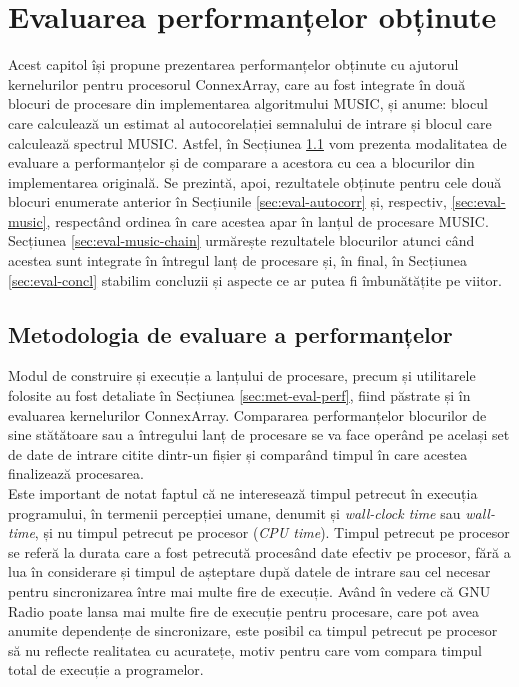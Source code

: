 \chapter{Evaluarea performanțelor obținute}
\label{chapter:eval}

Acest capitol își propune prezentarea performanțelor obținute cu ajutorul
kernelurilor pentru procesorul ConnexArray, care au fost integrate în două
blocuri de procesare din implementarea algoritmului MUSIC, și anume: blocul care
calculează un estimat al autocorelației semnalului de intrare și blocul care
calculează spectrul MUSIC. Astfel, în Secțiunea \ref{sec:eval-met} vom prezenta
modalitatea de evaluare a performanțelor și de comparare a acestora cu cea a
blocurilor din implementarea originală. Se prezintă, apoi, rezultatele obținute
pentru cele două blocuri enumerate anterior în Secțiunile \ref{sec:eval-autocorr} și,
respectiv, \ref{sec:eval-music}, respectând ordinea în care acestea apar în
lanțul de procesare MUSIC. Secțiunea \ref{sec:eval-music-chain} urmărește
rezultatele blocurilor atunci când acestea sunt integrate în întregul lanț de
procesare și, în final, în Secțiunea \ref{sec:eval-concl} stabilim concluzii și
aspecte ce ar putea fi îmbunătățite pe viitor.

\section{Metodologia de evaluare a performanțelor}
\label{sec:eval-met}

Modul de construire și execuție a lanțului de procesare, precum și utilitarele
folosite au fost detaliate în Secțiunea \ref{sec:met-eval-perf}, fiind păstrate
și în evaluarea kernelurilor ConnexArray. Compararea performanțelor
blocurilor de sine stătătoare sau a întregului lanț de procesare se va face
operând pe același set de date de intrare citite dintr-un fișier și comparând
timpul în care acestea finalizează procesarea. \\

Este important de notat faptul că ne interesează timpul petrecut în execuția
programului, în termenii percepției umane, denumit și \textit{wall-clock time}
sau \textit{wall-time}, și nu timpul petrecut pe procesor (\textit{CPU time}).
Timpul petrecut pe procesor se referă la durata care a fost petrecută procesând
date efectiv pe procesor, fără a lua în considerare și timpul de așteptare după
datele de intrare sau cel necesar pentru sincronizarea între mai multe fire de
execuție. Având în vedere că GNU Radio poate lansa mai multe fire de execuție
pentru procesare, care pot avea anumite dependențe de sincronizare, este posibil
ca timpul petrecut pe procesor să nu reflecte realitatea cu acuratețe, motiv
pentru care vom compara timpul total de execuție a programelor. \\


